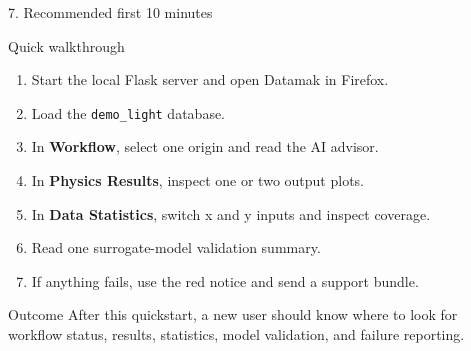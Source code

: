 \documentclass[aspectratio=169,11pt]{beamer}
\newcommand{\code}[1]{\texttt{#1}}
\begin{document}
\begin{frame}{7. Recommended first 10 minutes}
  \begin{block}{Quick walkthrough}
    \footnotesize
    \begin{enumerate}
      \item Start the local Flask server and open Datamak in Firefox.
      \item Load the \code{demo\_light} database.
      \item In \textbf{Workflow}, select one origin and read the AI advisor.
      \item In \textbf{Physics Results}, inspect one or two output plots.
      \item In \textbf{Data Statistics}, switch x and y inputs and inspect
      coverage.
      \item Read one surrogate-model validation summary.
      \item If anything fails, use the red notice and send a support bundle.
    \end{enumerate}
  \end{block}

  \begin{alertblock}{Outcome}
    After this quickstart, a new user should know where to look for workflow
    status, results, statistics, model validation, and failure reporting.
  \end{alertblock}
\end{frame}
\end{document}
